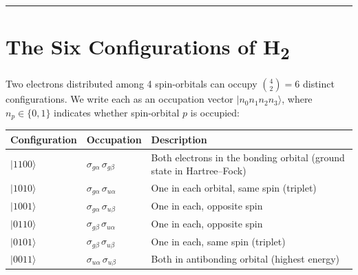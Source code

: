 \documentclass[
  11pt,
  oneside]{book}
\begin{document}
\begin{center}\rule{0.5\linewidth}{0.5pt}\end{center}

\section{The Six Configurations of
H\textsubscript{2}}\label{the-six-configurations-of-hux2082}

Two electrons distributed among 4 spin-orbitals can occupy
\(\binom{4}{2} = 6\) distinct configurations. We write each as an
occupation vector \(\lvert n_0 n_1 n_2 n_3\rangle\), where
\(n_p \in \{0, 1\}\) indicates whether spin-orbital \(p\) is occupied:

\begin{longtable}[]{@{}
  >{\centering\arraybackslash}p{}
  >{\centering\arraybackslash}p{}
  >{\raggedright\arraybackslash}p{}@{}}
\toprule\noalign{}
\begin{minipage}[b]{\linewidth}\centering
Configuration
\end{minipage} & \begin{minipage}[b]{\linewidth}\centering
Occupation
\end{minipage} & \begin{minipage}[b]{\linewidth}\raggedright
Description
\end{minipage} \\
\midrule\noalign{}
\endhead
\bottomrule\noalign{}
\endlastfoot
\(\lvert 1100\rangle\) & \(\sigma_{g\alpha}\, \sigma_{g\beta}\) & Both
electrons in the bonding orbital (ground state in Hartree--Fock) \\
\(\lvert 1010\rangle\) & \(\sigma_{g\alpha}\, \sigma_{u\alpha}\) & One
in each orbital, same spin (triplet) \\
\(\lvert 1001\rangle\) & \(\sigma_{g\alpha}\, \sigma_{u\beta}\) & One in
each, opposite spin \\
\(\lvert 0110\rangle\) & \(\sigma_{g\beta}\, \sigma_{u\alpha}\) & One in
each, opposite spin \\
\(\lvert 0101\rangle\) & \(\sigma_{g\beta}\, \sigma_{u\beta}\) & One in
each, same spin (triplet) \\
\(\lvert 0011\rangle\) & \(\sigma_{u\alpha}\, \sigma_{u\beta}\) & Both
in antibonding orbital (highest energy) \\
\end{longtable}
\end{document}
